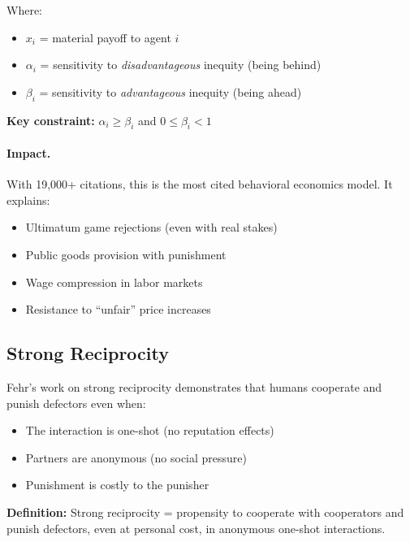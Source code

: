 Where:
\begin{itemize}[nosep]
    \item $x_i$ = material payoff to agent $i$
    \item $\alpha_i$ = sensitivity to \textit{disadvantageous} inequity (being behind)
    \item $\beta_i$ = sensitivity to \textit{advantageous} inequity (being ahead)
\end{itemize}

\textbf{Key constraint:} $\alpha_i \geq \beta_i$ and $0 \leq \beta_i < 1$

\paragraph{Impact.} With 19,000+ citations, this is the most cited behavioral
economics model. It explains:
\begin{itemize}[nosep]
    \item Ultimatum game rejections (even with real stakes)
    \item Public goods provision with punishment
    \item Wage compression in labor markets
    \item Resistance to ``unfair'' price increases
\end{itemize}

\subsection{Strong Reciprocity}
\label{sec:feh-reciprocity}

Fehr's work on strong reciprocity \citep{fehr2002strong, PAP-gaechter2002altruistic}
demonstrates that humans cooperate and punish defectors even when:
\begin{itemize}[nosep]
    \item The interaction is one-shot (no reputation effects)
    \item Partners are anonymous (no social pressure)
    \item Punishment is costly to the punisher
\end{itemize}

\textbf{Definition:} Strong reciprocity = propensity to cooperate with cooperators
and punish defectors, even at personal cost, in anonymous one-shot interactions.

